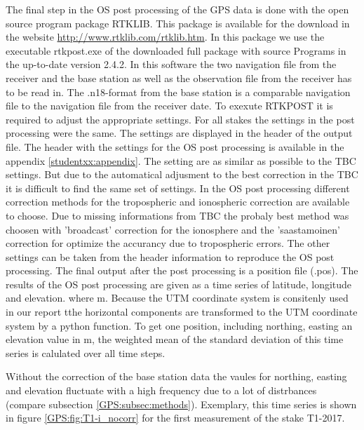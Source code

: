 The final step in the OS post processing of the GPS data is done with the open source program package RTKLIB.
This package is available for the download in the website \url{http://www.rtklib.com/rtklib.htm}.
In this package we use the executable rtkpost.exe of the downloaded full package with source Programs in the up-to-date version 2.4.2.
In this software the two navigation file from the receiver and the base station as well as the observation file from the receiver has to be read in.
The .n18-format from the base station is a comparable navigation file to the navigation file from the receiver date. 
To exexute RTKPOST it is required to adjust the appropriate settings.
For all stakes the settings in the post processing were the same.
The settings are displayed in the header of the output file.
The header with the settings for the OS post processing is available in the appendix \ref{studentxx:appendix}.
The setting are as similar as possible to the TBC settings.
But due to the automatical adjusment to the best correction in the TBC it is difficult to find the same set of settings.
In the OS post processing different correction methods for the tropospheric and ionospheric correction are available to choose. 
Due to missing informations from TBC the probaly best method was choosen with 'broadcast' correction for the ionosphere and the 'saastamoinen' correction for optimize the accurancy due to tropospheric errors. 
The other settings can be taken from the header information to reproduce the OS post processing. 
The final output after the post processing is a position file (.pos). 
The results of the OS post processing are given as a time series of latitude, longitude and elevation. where m. 
Because the UTM coordinate system is consitenly used in our report tthe horizontal components are transformed to the UTM coordinate system by a python function.
To get one position, including northing, easting an elevation value in m, the weighted mean of the standard deviation of this time series is calulated over all time steps.
\medskip

Without the correction of the base station data the vaules for northing, easting and elevation fluctuate with a high frequency due to a lot of distrbances (compare subsection \ref{GPS:subsec:methods}). 
Exemplary, this time series is shown in figure \ref{GPS:fig:T1-i_nocorr} for the first measurement of the stake T1-2017.

